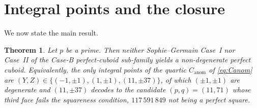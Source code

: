 \documentclass[11pt,reqno]{amsart}
\theoremstyle{plain}
\newtheorem{theorem}{Theorem}
\theoremstyle{definition}
\newcommand{\Canom}{C_{\mathrm{anom}}}
\begin{document}
\section{Integral points and the closure}

We now state the main result.

\begin{theorem}\label{thm:main}
Let $p$ be a prime. Then neither Sophie--Germain Case~I nor Case~II of the Case-B
perfect-cuboid sub-family yields a non-degenerate perfect cuboid. Equivalently, the only
integral points of the quartic $\Canom$ of \eqref{eq:Canom} are
$(Y,Z)\in\{(-1,\pm1),(1,\pm1),(11,\pm37)\}$, of which $(\pm1,\pm1)$ are degenerate and
$(11,\pm37)$ decodes to the candidate $(p,q)=(11,71)$ whose third face fails the
squareness condition, $117\,591\,849$ not being a perfect square.
\end{theorem}
\end{document}
